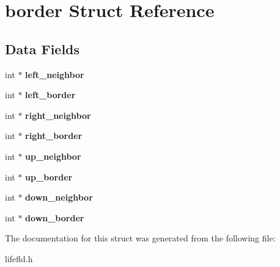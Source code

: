 \hypertarget{structborder}{}\section{border Struct Reference}
\label{structborder}
\subsection*{Data Fields}
\begin{DoxyCompactItemize}
\item 
\hypertarget{structborder_ad9180674bd187d2d03c1df75cfe09b5c}{}int $\ast$ {\bfseries left\+\_\+neighbor}\label{structborder_ad9180674bd187d2d03c1df75cfe09b5c}

\item 
\hypertarget{structborder_aeeebec46746633e69355c0041c87a6ae}{}int $\ast$ {\bfseries left\+\_\+border}\label{structborder_aeeebec46746633e69355c0041c87a6ae}

\item 
\hypertarget{structborder_aba1475f2a488b21361600147af4a88d6}{}int $\ast$ {\bfseries right\+\_\+neighbor}\label{structborder_aba1475f2a488b21361600147af4a88d6}

\item 
\hypertarget{structborder_a52e70a5be2f727a9687e12ef48f7ff3b}{}int $\ast$ {\bfseries right\+\_\+border}\label{structborder_a52e70a5be2f727a9687e12ef48f7ff3b}

\item 
\hypertarget{structborder_a517e3084650ac9f1b2082b166e0396e3}{}int $\ast$ {\bfseries up\+\_\+neighbor}\label{structborder_a517e3084650ac9f1b2082b166e0396e3}

\item 
\hypertarget{structborder_aa03d07abcb95934a80f3a5216a437e05}{}int $\ast$ {\bfseries up\+\_\+border}\label{structborder_aa03d07abcb95934a80f3a5216a437e05}

\item 
\hypertarget{structborder_af38f8c295590a5b07d90ccf4b246692b}{}int $\ast$ {\bfseries down\+\_\+neighbor}\label{structborder_af38f8c295590a5b07d90ccf4b246692b}

\item 
\hypertarget{structborder_a91c057e02d53238e157ee6e67f694177}{}int $\ast$ {\bfseries down\+\_\+border}\label{structborder_a91c057e02d53238e157ee6e67f694177}

\end{DoxyCompactItemize}


The documentation for this struct was generated from the following file\+:\begin{DoxyCompactItemize}
\item 
lifefld.\+h\end{DoxyCompactItemize}
